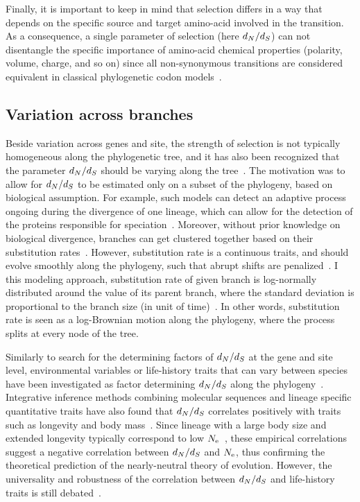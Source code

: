 Finally, it is important to keep in mind that selection differs in a way that depends on the specific source and target amino-acid involved in the {transition}.
As a consequence, a single parameter of selection (here $d_N / d_S$) can not disentangle the specific importance of amino-acid chemical properties (polarity, volume, charge, and so on) since all non-synonymous {transitions} are considered equivalent in classical phylogenetic \gls{codon} models~\citep{Dutheil2008}.

\subsection{Variation across branches}

Beside variation across genes and site, the strength of selection is not typically homogeneous along the phylogenetic tree, and it has also been recognized that the parameter $d_N / d_S$ should be varying along the tree~\citep{Yang1998}.
The motivation was to allow for $d_N / d_S$ to be estimated only on a subset of the phylogeny, based on biological assumption.
For example, such models can detect an adaptive process ongoing during the divergence of one lineage, which can allow for the detection of the proteins responsible for speciation~\citep{Yang2001, Zhang2004}.
Moreover, without \gls{prior} knowledge on biological divergence, branches can get clustered together based on their \gls{substitution} rates~\citep{Dutheil2012a}.
However, \gls{substitution} rate is a continuous traits, and should evolve smoothly along the phylogeny, such that abrupt shifts are penalized~\citep{Huelsenbeck2003,Seo2004}.
I this modeling approach, \gls{substitution} rate of given branch is log-normally distributed around the value of its parent branch, where the standard deviation is proportional to the branch size (in unit of time)~\citep{Lartillot2011, Brevet2019}.
In other words, \gls{substitution} rate is seen as a log-Brownian motion along the phylogeny, where the process splits at every node of the tree. 

Similarly to search for the determining factors of $d_N / d_S$ at the gene and site level, environmental variables or life-history traits that can vary between species have been investigated as factor determining $d_N / d_S$ along the phylogeny~\citep{Felsenstein1985,Romiguier2014}.
Integrative inference methods combining molecular sequences and lineage specific quantitative traits have also found that $d_N / d_S$ correlates positively with traits such as longevity and body mass~\citep{Lartillot2011, Figuet2017}.
Since lineage with a large body size and extended longevity typically correspond to low $N_{\textrm{e}}$~\citep{Romiguier2014}, these empirical correlations suggest a negative correlation between $d_N / d_S$ and $N_{\textrm{e}}$, thus confirming the theoretical prediction of the \gls{nearly-neutral} theory of evolution.
However, the universality and robustness of the correlation between $d_N / d_S$ and life-history traits is still debated~\citep{Nabholz2013, Lanfear2014, Figuet2016}.

